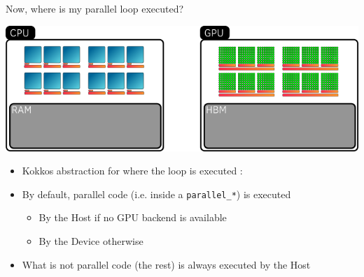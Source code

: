 \documentclass[aspectratio=169]{beamer}
\begin{document}

\begin{frame}{Now, where is my parallel loop executed?}
    \begin{center}
        \includegraphics[width=0.8\linewidth]{execution_space.png}
    \end{center}
    \begin{itemize}
        \item Kokkos abstraction for where the loop is executed : 
        \item By default, parallel code (i.e. inside a \texttt{parallel\_*}) is executed
        \begin{itemize}
            \item By the Host if no GPU backend is available
            \item By the Device otherwise
        \end{itemize}
        \item What is not parallel code (the rest) is always executed by the Host
    \end{itemize}
\end{frame}

\end{document}
